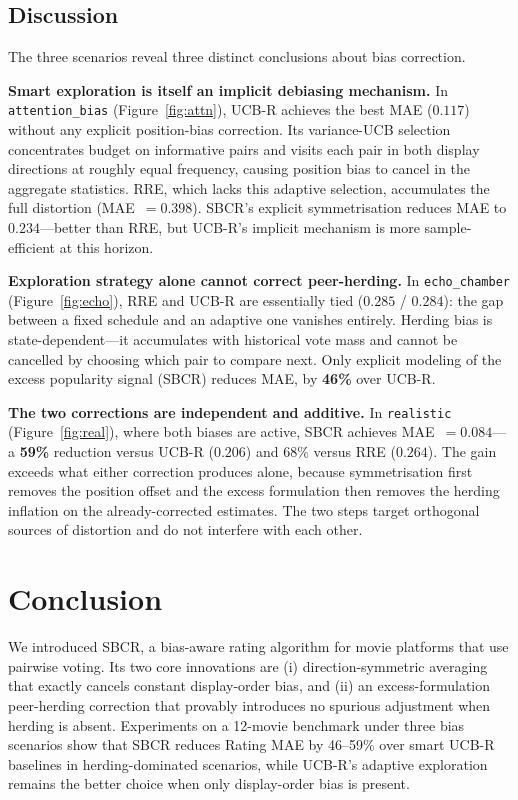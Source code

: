 \documentclass[12pt,a4paper]{article}
\begin{document}
\subsection{Discussion}

The three scenarios reveal three distinct conclusions about bias correction.

\textbf{Smart exploration is itself an implicit debiasing mechanism.}
In \texttt{attention\_bias} (Figure~\ref{fig:attn}), UCB-R achieves the best
MAE ($0.117$) without any explicit position-bias correction.
Its variance-UCB selection concentrates budget on informative pairs and visits
each pair in both display directions at roughly equal frequency, causing
position bias to cancel in the aggregate statistics.
RRE, which lacks this adaptive selection, accumulates the full distortion
(MAE~$=0.398$).
SBCR's explicit symmetrisation reduces MAE to $0.234$—better than RRE, but
UCB-R's implicit mechanism is more sample-efficient at this horizon.

\textbf{Exploration strategy alone cannot correct peer-herding.}
In \texttt{echo\_chamber} (Figure~\ref{fig:echo}), RRE and UCB-R are
essentially tied ($0.285$ / $0.284$): the gap between a fixed schedule and
an adaptive one vanishes entirely.
Herding bias is state-dependent—it accumulates with historical vote mass and
cannot be cancelled by choosing which pair to compare next.
Only explicit modeling of the excess popularity signal (SBCR) reduces MAE,
by \textbf{46\%} over UCB-R.

\textbf{The two corrections are independent and additive.}
In \texttt{realistic} (Figure~\ref{fig:real}), where both biases are active,
SBCR achieves MAE~$=\mathbf{0.084}$—a \textbf{59\%} reduction versus UCB-R
($0.206$) and $68\%$ versus RRE ($0.264$).
The gain exceeds what either correction produces alone, because symmetrisation
first removes the position offset and the excess formulation then removes the
herding inflation on the already-corrected estimates.
The two steps target orthogonal sources of distortion and do not interfere with
each other.

\section{Conclusion}

We introduced SBCR, a bias-aware rating algorithm for movie platforms that use
pairwise voting.  Its two core innovations are (i) direction-symmetric averaging
that exactly cancels constant display-order bias, and (ii) an excess-formulation
peer-herding correction that provably introduces no spurious adjustment when
herding is absent.  Experiments on a 12-movie benchmark under three bias scenarios
show that SBCR reduces Rating MAE by 46--59\% over smart UCB-R baselines in
herding-dominated scenarios, while UCB-R's adaptive exploration remains the better
choice when only display-order bias is present.
\end{document}
